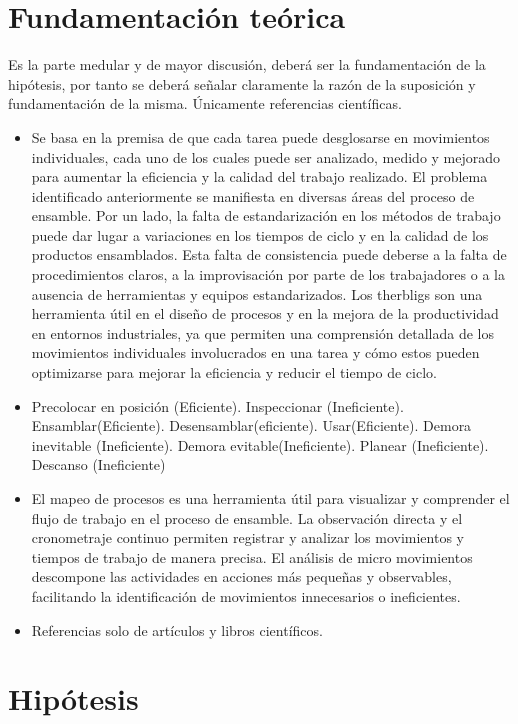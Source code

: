   \section{Fundamentación teórica}
  
  Es la parte medular y de mayor discusión, deberá ser la fundamentación de la hipótesis, por tanto se deberá señalar claramente la razón de la suposición y fundamentación de la misma. Únicamente referencias científicas.
  \begin{itemize}
      \item Se basa en la premisa de que cada tarea puede desglosarse en movimientos individuales, cada uno de los cuales puede ser
  analizado, medido y mejorado para aumentar la eficiencia y la calidad del trabajo realizado.
  El problema identificado anteriormente se manifiesta en diversas áreas del proceso de ensamble. Por un lado, la falta de estandarización en los métodos de trabajo puede dar lugar a variaciones en los tiempos de ciclo y en la calidad de los
  productos ensamblados. Esta falta de consistencia puede deberse a la falta de procedimientos claros, a la improvisación por parte de los trabajadores o a la ausencia de herramientas y equipos estandarizados.
  Los therbligs son una herramienta útil en el diseño de procesos y en la mejora de la productividad en entornos industriales, ya que permiten una comprensión detallada de los movimientos individuales involucrados en una tarea y cómo estos pueden optimizarse para mejorar la eficiencia y reducir el tiempo de ciclo.
  
      \item Precolocar en posición (Eficiente).
  Inspeccionar (Ineficiente).
  Ensamblar(Eficiente).
  Desensamblar(eficiente).
  Usar(Eficiente).
  Demora inevitable (Ineficiente).
  Demora evitable(Ineficiente).
  Planear (Ineficiente).
  Descanso (Ineficiente) 
      \item El mapeo de procesos es una herramienta útil para visualizar y comprender el flujo de trabajo en el proceso de
  ensamble. La observación directa y el cronometraje continuo permiten registrar y analizar los movimientos y tiempos de trabajo de manera precisa. El análisis de micro movimientos descompone las actividades en acciones más pequeñas y observables, facilitando la identificación de movimientos innecesarios o ineficientes.
      \item Referencias solo de artículos y libros científicos.
  \end{itemize}
  \section{Hipótesis}
  
